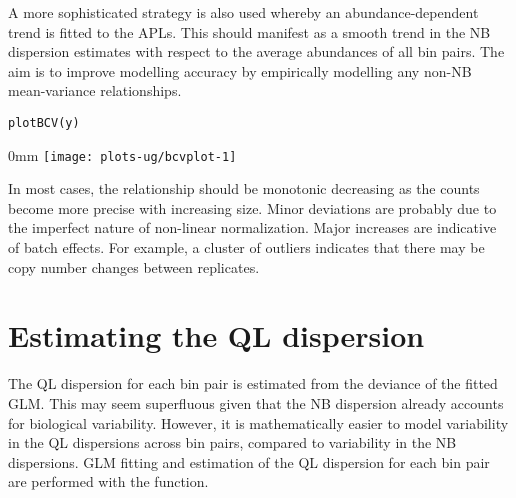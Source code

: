 \documentclass{report}\usepackage[]{graphicx}\usepackage[usenames,dvipsnames]{color}
\makeatletter
\def\maxwidth{ %
  \ifdim\Gin@nat@width>\linewidth
    \linewidth
  \else
    \Gin@nat@width
  \fi
}
\newcommand{\hlopt}[1]{\textcolor[rgb]{0,0,0}{#1}}%
\newcommand{\hlstd}[1]{\textcolor[rgb]{0.251,0.251,0.251}{#1}}%
\newcommand{\hlkwb}[1]{\textcolor[rgb]{0,0,0}{#1}}%
\newcommand{\hlkwd}[1]{\textcolor[rgb]{0.878,0.439,0.125}{#1}}%
\newenvironment{knitrout}{}{} %
\makeatother
\begin{document}
\begin{knitrout}
\color{fgcolor}
\end{knitrout}

A more sophisticated strategy is also used whereby an abundance-dependent trend is fitted to the APLs.
This should manifest as a smooth trend in the NB dispersion estimates with respect to the average abundances of all bin pairs.
The aim is to improve modelling accuracy by empirically modelling any non-NB mean-variance relationships.

\begin{knitrout}
\color{fgcolor}\begin{kframe}
\begin{alltt}
\hlkwd{plotBCV}\hlstd{(y)}
\end{alltt}
\end{kframe}\begin{adjustwidth}{\fltoffset}{0mm}
\texttt{[image: plots-ug/bcvplot-1]} \end{adjustwidth}
\end{knitrout}

In most cases, the relationship should be monotonic decreasing as the counts become more precise with increasing size.
Minor deviations are probably due to the imperfect nature of non-linear normalization.
Major increases are indicative of batch effects.
For example, a cluster of outliers indicates that there may be copy number changes between replicates.

\section{Estimating the QL dispersion}
The QL dispersion for each bin pair is estimated from the deviance of the fitted GLM.
This may seem superfluous given that the NB dispersion already accounts for biological variability.
However, it is mathematically easier to model variability in the QL dispersions across bin pairs, compared to variability in the NB dispersions.
GLM fitting and estimation of the QL dispersion for each bin pair are performed with the  function.
\end{document}
